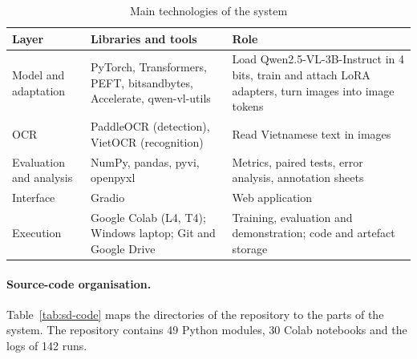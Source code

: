 \begin{table}[htbp]
\caption{Main technologies of the system}
\label{tab:sd-stack}
\centering
\small
\begin{tabular}{p{}p{}p{}}
\toprule
\raggedright \textbf{Layer} & \raggedright \textbf{Libraries and tools} & \raggedright \textbf{Role} \tabularnewline
\midrule
\raggedright Model and adaptation & \raggedright PyTorch, Transformers, PEFT, bitsandbytes, Accelerate, qwen-vl-utils & \raggedright Load Qwen2.5-VL-3B-Instruct in 4 bits, train and attach LoRA adapters, turn images into image tokens \tabularnewline
\raggedright OCR & \raggedright PaddleOCR (detection), VietOCR (recognition) & \raggedright Read Vietnamese text in images \tabularnewline
\raggedright Evaluation and analysis & \raggedright NumPy, pandas, pyvi, openpyxl & \raggedright Metrics, paired tests, error analysis, annotation sheets \tabularnewline
\raggedright Interface & \raggedright Gradio & \raggedright Web application \tabularnewline
\raggedright Execution & \raggedright Google Colab (L4, T4); Windows laptop; Git and Google Drive & \raggedright Training, evaluation and demonstration; code and artefact storage \tabularnewline
\bottomrule
\end{tabular}
\end{table}

\paragraph{Source-code organisation.} Table~\ref{tab:sd-code} maps the directories of the
repository to the parts of the system. The repository contains 49 Python modules, 30 Colab
notebooks and the logs of 142 runs.

